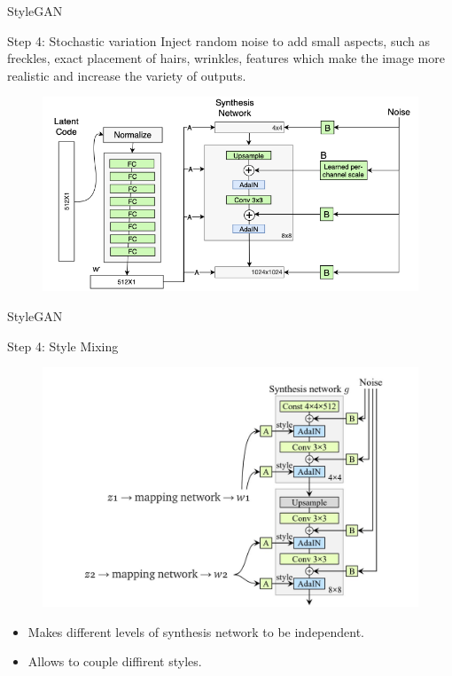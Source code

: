 \begin{frame}{StyleGAN}
	\begin{block}{Step 4: Stochastic variation}
		Inject random noise to add small aspects, such as freckles, exact placement of hairs, wrinkles, features which make the image more realistic and increase the variety of outputs.
		\begin{figure}
			\centering
			\includegraphics[width=0.9\linewidth]{figs/stylegan_noise}
		\end{figure}
	\end{block}

\end{frame}
\begin{frame}{StyleGAN}
	\begin{block}{Step 4: Style Mixing}
		\vspace{-0.33cm}
		\begin{figure}
			\centering
			\includegraphics[width=0.8\linewidth]{figs/stylegan_mix_reg}
		\end{figure}
	\begin{itemize}
		\item Makes different levels of synthesis network to be independent.
		\item Allows to couple diffirent styles.
	\end{itemize}
	\end{block}

\end{frame}
